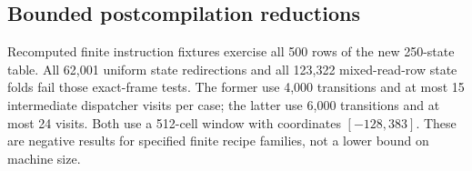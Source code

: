 \subsection{Bounded postcompilation reductions}
Recomputed finite instruction fixtures exercise all 500 rows of the new
250-state table. All 62,001 uniform state redirections and all 123,322
mixed-read-row state folds fail those exact-frame tests. The former use
4,000 transitions and at most 15 intermediate dispatcher visits per case;
the latter use 6,000 transitions and at most 24 visits. Both use a
512-cell window with coordinates $[-128,383]$. These are negative results
for specified finite recipe families, not a lower bound on machine size.
